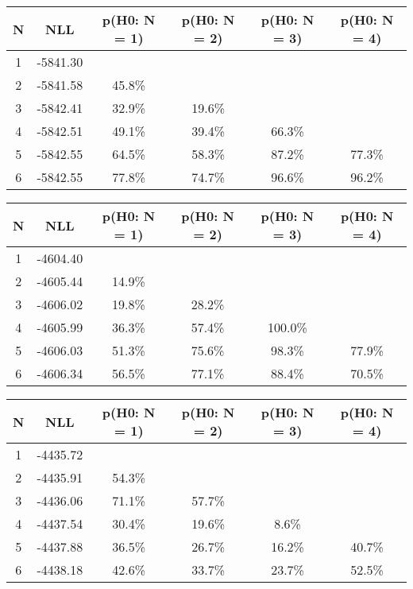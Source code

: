 \begin{table}[htb]
	\begin{center}
{\footnotesize\renewcommand{\arraystretch}{1.4}
		\begin{tabular}{cc||cccc}
			N & NLL & p(H0: N = 1) & p(H0: N = 2) & p(H0: N = 3) & p(H0: N = 4)\\ 
		\hline
1 & -5841.30 & & & & \\
2 & -5841.58 & 45.8\% & & & \\
3 & -5842.41 & 32.9\% & 19.6\% & & \\
4 & -5842.51 & 49.1\% & 39.4\% & 66.3\% & \\
5 & -5842.55 & 64.5\% & 58.3\% & 87.2\% & 77.3\% \\
6 & -5842.55 & 77.8\% & 74.7\% & 96.6\% & 96.2\% \\
	\end{tabular}
		\label{tab:lab}
	}
	\end{center}\end{table}

\begin{table}[htb]
	\begin{center}
{\footnotesize\renewcommand{\arraystretch}{1.4}
		\begin{tabular}{cc||cccc}
			N & NLL & p(H0: N = 1) & p(H0: N = 2) & p(H0: N = 3) & p(H0: N = 4)\\ 
		\hline
1 & -4604.40 & & & & \\
2 & -4605.44 & 14.9\% & & & \\
3 & -4606.02 & 19.8\% & 28.2\% & & \\
4 & -4605.99 & 36.3\% & 57.4\% & 100.0\% & \\
5 & -4606.03 & 51.3\% & 75.6\% & 98.3\% & 77.9\% \\
6 & -4606.34 & 56.5\% & 77.1\% & 88.4\% & 70.5\% \\
	\end{tabular}
		\label{tab:lab}
	}
	\end{center}\end{table}

\begin{table}[htb]
	\begin{center}
{\footnotesize\renewcommand{\arraystretch}{1.4}
		\begin{tabular}{cc||cccc}
			N & NLL & p(H0: N = 1) & p(H0: N = 2) & p(H0: N = 3) & p(H0: N = 4)\\ 
		\hline
1 & -4435.72 & & & & \\
2 & -4435.91 & 54.3\% & & & \\
3 & -4436.06 & 71.1\% & 57.7\% & & \\
4 & -4437.54 & 30.4\% & 19.6\% & 8.6\% & \\
5 & -4437.88 & 36.5\% & 26.7\% & 16.2\% & 40.7\% \\
6 & -4438.18 & 42.6\% & 33.7\% & 23.7\% & 52.5\% \\
	\end{tabular}
		\label{tab:lab}
	}
	\end{center}\end{table}

